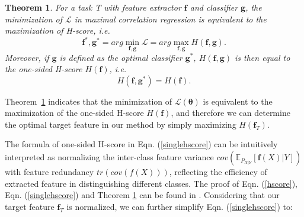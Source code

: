 \documentclass[letterpaper]{article} %
\newtheorem{theorem}{Theorem}
\begin{document}
\begin{theorem}
    For a task T with feature extractor $\boldsymbol{f}$ and classifier $\boldsymbol{g}$, the minimization of $\mathcal L$ in maximal correlation regression is equivalent to the maximization of H-score, \textit{i.e.}
    \begin{equation}
         \boldsymbol{f}^*, \boldsymbol{g}^* = arg \min_{\boldsymbol{f},\boldsymbol{g}}\mathcal L = arg \max_{\boldsymbol{f},\boldsymbol{g}} H(\boldsymbol{f}, \boldsymbol{g}).
    \end{equation}
     \noindent Moreover, if $\boldsymbol{g}$ is defined as the optimal classifier $\boldsymbol{g}^*$, $H(\boldsymbol{f},\boldsymbol{g})$ is then equal to the one-sided H-score $H(\boldsymbol{f})$,
    \textit{i.e.}
    \begin{equation}
    H(\boldsymbol{f}, \boldsymbol{g}^*) = H(\boldsymbol{f}) .
    \label{hscoremeaning}
    \end{equation}
    \label{theo:hscore}
\end{theorem}

Theorem~\ref{theo:hscore} indicates that the minimization of $\mathcal L(\boldsymbol{\theta})$ is equivalent to the maximization of the one-sided H-score $H(\boldsymbol{f})$, and therefore we can determine the optimal target feature in our method by simply maximizing $H(\boldsymbol{f}_T)$. 

The formula of one-sided H-score in Eqn. (\ref{singlehscore}) can be intuitively interpreted as normalizing the inter-class feature variance $cov(\mathbb{E}_{P_{X|Y}}[\boldsymbol{f}(X)|Y])$ with feature redundancy $tr(cov(f(X)))$, reflecting the efficiency of extracted feature in distinguishing different classes. The proof of Eqn. (\ref{hscore}), Eqn. (\ref{singlehscore}) and Theorem \ref{theo:hscore} can be found in \citep{huang2019information, bao2019information,xu2020maximal}. Considering that our target feature $\boldsymbol{f}_T$ is normalized, we can further simplify Eqn. (\ref{singlehscore}) to:
\end{document}
